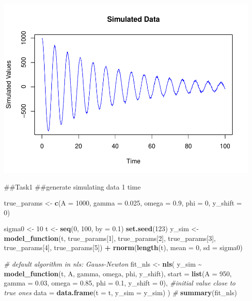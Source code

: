 \documentclass[
]{article}
\newenvironment{Shaded}{\begin{snugshade}}{\end{snugshade}}
\newcommand{\AttributeTok}[1]{\textcolor[rgb]{0.13,0.29,0.53}{#1}}
\newcommand{\CommentTok}[1]{\textcolor[rgb]{0.56,0.35,0.01}{\textit{#1}}}
\newcommand{\DecValTok}[1]{\textcolor[rgb]{0.00,0.00,0.81}{#1}}
\newcommand{\FloatTok}[1]{\textcolor[rgb]{0.00,0.00,0.81}{#1}}
\newcommand{\FunctionTok}[1]{\textcolor[rgb]{0.13,0.29,0.53}{\textbf{#1}}}
\newcommand{\NormalTok}[1]{#1}
\newcommand{\OtherTok}[1]{\textcolor[rgb]{0.56,0.35,0.01}{#1}}
\newcommand{\SpecialCharTok}[1]{\textcolor[rgb]{0.81,0.36,0.00}{\textbf{#1}}}
\begin{document}
\includegraphics{CircadianProjectForMcManus_files/figure-latex/unnamed-chunk-7-1.pdf}

\#\#Task1 \#\#generate simulating data 1 time

\begin{Shaded}
\begin{Highlighting}[]
\NormalTok{true\_params }\OtherTok{\textless{}{-}} \FunctionTok{c}\NormalTok{(}\AttributeTok{A =} \DecValTok{1000}\NormalTok{, }\AttributeTok{gamma =} \FloatTok{0.025}\NormalTok{, }\AttributeTok{omega =} \FloatTok{0.9}\NormalTok{, }\AttributeTok{phi =} \DecValTok{0}\NormalTok{, }\AttributeTok{y\_shift =} \DecValTok{0}\NormalTok{)}

\NormalTok{sigma0 }\OtherTok{\textless{}{-}} \DecValTok{10}
\NormalTok{t }\OtherTok{\textless{}{-}} \FunctionTok{seq}\NormalTok{(}\DecValTok{0}\NormalTok{, }\DecValTok{100}\NormalTok{, }\AttributeTok{by =} \FloatTok{0.1}\NormalTok{)}
\FunctionTok{set.seed}\NormalTok{(}\DecValTok{123}\NormalTok{)}
\NormalTok{y\_sim }\OtherTok{\textless{}{-}} \FunctionTok{model\_function}\NormalTok{(t, true\_params[}\DecValTok{1}\NormalTok{], true\_params[}\DecValTok{2}\NormalTok{], true\_params[}\DecValTok{3}\NormalTok{], true\_params[}\DecValTok{4}\NormalTok{], true\_params[}\DecValTok{5}\NormalTok{]) }\SpecialCharTok{+} 
         \FunctionTok{rnorm}\NormalTok{(}\FunctionTok{length}\NormalTok{(t), }\AttributeTok{mean =} \DecValTok{0}\NormalTok{, }\AttributeTok{sd =}\NormalTok{ sigma0)}

\CommentTok{\# default algorithm in nls: Gauss{-}Newton}
\NormalTok{fit\_nls }\OtherTok{\textless{}{-}} \FunctionTok{nls}\NormalTok{(}
\NormalTok{  y\_sim }\SpecialCharTok{\textasciitilde{}} \FunctionTok{model\_function}\NormalTok{(t, A, gamma, omega, phi, y\_shift),}
  \AttributeTok{start =} \FunctionTok{list}\NormalTok{(}\AttributeTok{A =} \DecValTok{950}\NormalTok{, }\AttributeTok{gamma =} \FloatTok{0.03}\NormalTok{, }\AttributeTok{omega =} \FloatTok{0.85}\NormalTok{, }\AttributeTok{phi =} \FloatTok{0.1}\NormalTok{, }\AttributeTok{y\_shift =} \DecValTok{0}\NormalTok{), }\CommentTok{\#initial value close to true ones}
  \AttributeTok{data =} \FunctionTok{data.frame}\NormalTok{(}\AttributeTok{t =}\NormalTok{ t, }\AttributeTok{y\_sim =}\NormalTok{ y\_sim)}
\NormalTok{)}
\CommentTok{\# }
\FunctionTok{summary}\NormalTok{(fit\_nls)}
\end{Highlighting}
\end{Shaded}
\end{document}

